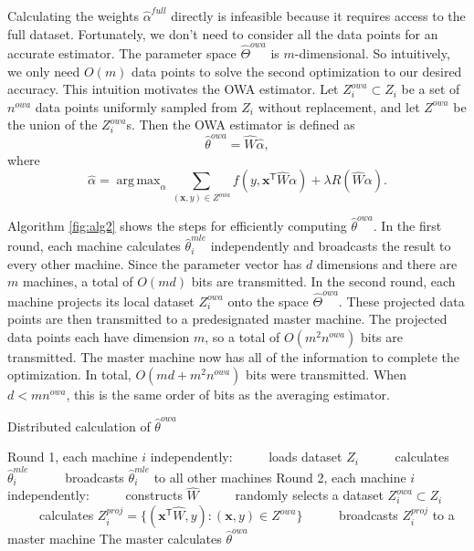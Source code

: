 \documentclass[twoside]{article}
\DeclareMathOperator*{\argmax}{arg\,max}
\newcommand{\Zproj}{Z^{\textit{proj}}}
\newcommand{\Zowa}{Z^{\textit{owa}}}
\newcommand{\nowa}{n^{\textit{owa}}}
\newcommand{\matW}{\hat W}
\newcommand{\W}{{\hat \Theta^{\textit{owa}}}}
\newcommand{\x}{\mathbf{x}}
\newcommand{\w}{\theta}
\newcommand{\ahat}{\hat\alpha}
\newcommand{\afull}{\ahat^{\textit{full}}}
\newcommand{\wowa}{\hat\w^{owa}}
\newcommand{\wmle}{\hat\w^{mle}}
\newcommand{\trans}[1]{\ensuremath{{#1}^{\mathsf{T}}}}
\begin{document}
Calculating the weights $\afull$ directly is infeasible because it requires access to the full dataset.
Fortunately, we don't need to consider all the data points for an accurate estimator.
The parameter space $\W$ is $m$-dimensional.
So intuitively, we only need $O(m)$ data points to solve the second optimization to our desired accuracy.
This intuition motivates the OWA estimator.
Let $\Zowa_i\subset Z_i$ be a set of $\nowa$ data points uniformly sampled from $Z_i$ without replacement,
and let $\Zowa$ be the union of the $\Zowa_i$s.
Then the OWA estimator is defined as
\begin{equation}
\wowa = \matW \ahat,
\end{equation}
where
\begin{equation}
\label{eq:ahat}
\ahat = \argmax_\alpha \sum _{(\x,y)\in \Zowa} f\left(y,\trans\x \matW \alpha \right)
+ \lambda R (\matW\alpha)
.
\end{equation}

Algorithm \ref{fig:alg2} shows the steps for efficiently computing $\wowa$.
In the first round, each machine calculates $\wmle_i$ independently and broadcasts the result to every other machine.
Since the parameter vector has $d$ dimensions and there are $m$ machines, a total of $O(md)$ bits are transmitted.
In the second round, each machine projects its local dataset $\Zowa_i$ onto the space $\W$.
These projected data points are then transmitted to a predesignated master machine.
The projected data points each have dimension $m$, so a total of $O(m^2\nowa)$ bits are transmitted.
The master machine now has all of the information to complete the optimization.
In total, $O(md + m^2\nowa)$ bits were transmitted.
When $d<m\nowa$, this is the same order of bits as the averaging estimator.

\begin{algorithm}[t]
\caption{Distributed calculation of $\wowa$}
\label{alg:distributed}
\begin{algorithmic}
\State Round 1, each machine $i$ independently:
\State ~~~~~loads dataset $Z_i$
\State ~~~~~calculates $\wmle_i$
\State ~~~~~broadcasts $\wmle_i$ to all other machines
\State Round 2, each machine $i$ independently:
\State ~~~~~constructs $\matW$
\State ~~~~~randomly selects a dataset $\Zowa_i\subset Z_i$
\State ~~~~~calculates $\Zproj_i=\{(\trans\x\matW,y) : (\x,y)\in\Zowa\}$
\State ~~~~~broadcasts $\Zproj_i$ to a master machine
\State The master calculates $\wowa$
\end{algorithmic}
\label{fig:alg2}
\end{algorithm}
\end{document}
